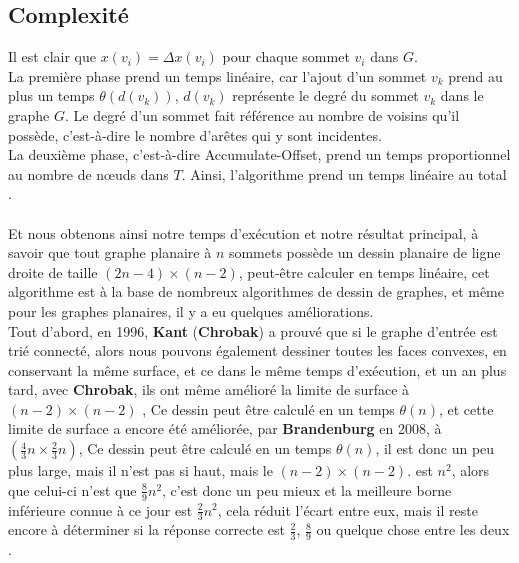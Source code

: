 \documentclass[hidelinks,letterpaper,12pt]{article}
\begin{document}
\subsection{Complexité}
\label{Complexité}
Il est clair que \(x(v_i) = \Delta x(v_i)\) pour chaque sommet $v_i$ dans $G$.\\
La première phase prend un temps linéaire, car l'ajout d'un sommet $v_k$ prend au plus un temps $\theta(d(v_k))$, $d(v_k)$ représente le degré du sommet $v_k$ dans le graphe $G$. Le degré d'un sommet fait référence au nombre de voisins qu'il possède, c'est-à-dire le nombre d'arêtes qui y sont incidentes.
\\
La deuxième phase, c'est-à-dire Accumulate-Offset, prend un temps proportionnel au nombre de nœuds dans $T$. Ainsi, l'algorithme prend un temps linéaire au total \citep{TakaoSaidur}.
\\ \\
Et nous obtenons ainsi notre temps d'exécution et notre résultat principal, à savoir que tout graphe planaire à $n$ sommets possède un dessin planaire de ligne droite de taille \((2n-4) \times (n-2)\), peut-être calculer en temps linéaire, cet algorithme est à la base de nombreux algorithmes de dessin de graphes, et même pour les graphes planaires, il y a eu quelques améliorations. 
\\ 
Tout d'abord, en 1996, \textbf{Kant} (\textbf{Chrobak}) a prouvé que si le graphe d'entrée est trié connecté, alors nous pouvons également dessiner toutes les faces convexes, en conservant la même surface, et ce dans le même temps d'exécution, et un an plus tard, avec \textbf{Chrobak}, ils ont même amélioré la limite de surface à \((n-2) \times (n-2)\) , Ce dessin peut être calculé en un temps $\theta(n)$, et cette limite de surface a encore été améliorée, par \textbf{Brandenburg} en 2008, à \((\frac{4}{3}n \times \frac{2}{3}n )\), Ce dessin peut être calculé en un temps $\theta(n)$, il est donc un peu plus large, mais il n'est pas si haut, mais le \((n-2) \times (n-2)\). est $n^2$, alors que celui-ci n'est que \(\frac{8}{9}n^2\), c'est donc un peu mieux et la meilleure borne inférieure connue à ce jour est \(\frac{2}{3}n^2\), cela réduit l'écart entre eux, mais il reste encore à déterminer si la réponse correcte est $\frac{2}{3}$, $\frac{8}{9}$ ou quelque chose entre les deux \citep{PhilippKindermann}.






\end{document}
